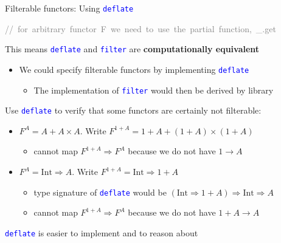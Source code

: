 \documentclass[english]{beamer}
\newenvironment{lyxcode}
   {\par\begin{list}{}{
     \setlength{\rightmargin}{\leftmargin}
     \setlength{\listparindent}{0pt}%
     \raggedright
     \setlength{\itemsep}{0pt}
     \setlength{\parsep}{0pt}
     \normalfont\ttfamily}%
    \def\{{\char`\{}
    \def\}{\char`\}}
    \def\textasciitilde{\char`\~}
    \item[]}
   {\end{list}}
\begin{document}
\begin{frame}{Filterable functors: Using \texttt{\textcolor{blue}{\footnotesize{}deflate}}}
\begin{itemize}
\begin{lyxcode}
\textrm{\textcolor{gray}{\footnotesize{}//~for~arbitrary~functor~}}\textcolor{gray}{\footnotesize{}F}\textrm{\textcolor{gray}{\footnotesize{}~we~need~to~use~the~partial~function,~}}\textcolor{gray}{\footnotesize{}\_.get}{\footnotesize \par}
\end{lyxcode}
\item This means \texttt{\textcolor{blue}{\footnotesize{}deflate}} and \texttt{\textcolor{blue}{\footnotesize{}filter}}
are \textbf{computationally equivalent}
\begin{itemize}
\item We could specify filterable functors by implementing \texttt{\textcolor{blue}{\footnotesize{}deflate}} 
\begin{itemize}
\item The implementation of \texttt{\textcolor{blue}{\footnotesize{}filter}}
would then be derived by library
\end{itemize}
\end{itemize}
\item Use \texttt{\textcolor{blue}{\footnotesize{}deflate}} to verify that
some functors are certainly not filterable:
\begin{itemize}
\item $F^{A}=A+A\times A$. Write $F^{1+A}=1+A+(1+A)\times(1+A)$ 
\begin{itemize}
\item cannot map $F^{1+A}\Rightarrow F^{A}$ because we do not have $1\rightarrow A$
\end{itemize}
\item $F^{A}=\text{Int}\Rightarrow A$. Write $F^{1+A}=\text{Int}\Rightarrow1+A$ 
\begin{itemize}
\item type signature of \texttt{\textcolor{blue}{\footnotesize{}deflate}}
would be $\left(\text{Int}\Rightarrow1+A\right)\Rightarrow\text{Int}\Rightarrow A$
\item cannot map $F^{1+A}\Rightarrow F^{A}$ because we do not have $1+A\rightarrow A$
\end{itemize}
\end{itemize}
\item \texttt{\textcolor{blue}{\footnotesize{}deflate}} is easier to implement
and to reason about
\end{itemize}
\end{frame}
\end{document}
